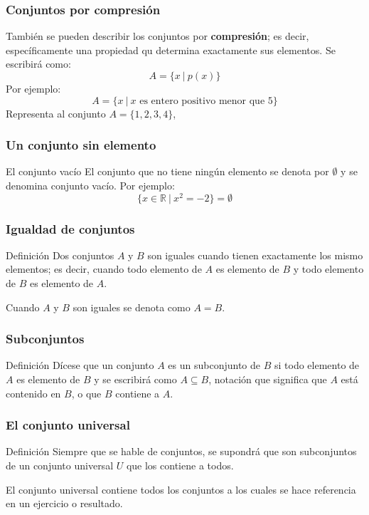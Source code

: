 \documentclass{beamer}
\begin{document}
\begin{frame}
\frametitle{Conjuntos por compresi\'on}
Tambi\'en se pueden describir los conjuntos por \textbf{compresi\'on}; es decir, espec\'ificamente una propiedad qu determina exactamente sus elementos. Se escribir\'a como:
\[A=\{x\ |\ p(x)\}\]
Por ejemplo:
\[A=\{x\ | \ x \textrm{\ es\ entero\ positivo\ menor\ que\ 5}\}\]
Representa al conjunto $A=\{1,2,3,4\}$,
\end{frame}



\begin{frame}
\frametitle{Un conjunto sin elemento}
\begin{block}{El conjunto vac\'io}
El conjunto que no tiene ning\'un elemento se denota por $\emptyset$ y se denomina conjunto vac\'io. Por ejemplo:
\[\{x\in\mathbb R\ | \ x^2 = -2\} = \emptyset\]
\end{block}
\end{frame}




\begin{frame}
\frametitle{Igualdad de conjuntos}
\begin{block}{Definici\'on}
Dos conjuntos $A$ y $B$ son iguales cuando tienen exactamente los mismo elementos; es decir, cuando todo elemento de $A$ es elemento de $B$ y todo elemento de $B$ es elemento de $A$. 

Cuando $A$ y $B$ son iguales se denota como $A=B$.
\end{block}
\end{frame}


\begin{frame}
\frametitle{Subconjuntos}
\begin{block}{Definici\'on}
D\'icese que un conjunto $A$ es un subconjunto de $B$ si todo elemento de $A$ es elemento de $B$ y se escribir\'a como $A\subseteq B$, notaci\'on que significa que $A$ est\'a contenido en $B$, o que $B$ contiene a $A$.
\end{block}
\end{frame}


\begin{frame}
\frametitle{El conjunto universal}
\begin{block}{Definici\'on}
Siempre que se hable de conjuntos, se supondr\'a que son subconjuntos de un conjunto universal $U$ que los contiene a todos.
\end{block}
El conjunto universal contiene todos los conjuntos a los cuales se hace referencia en un ejercicio o resultado.
\end{frame}
\end{document}
